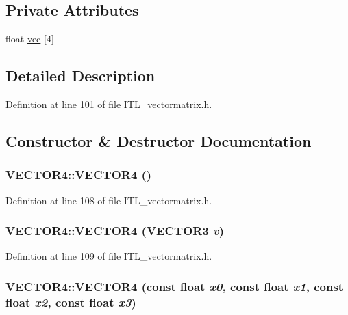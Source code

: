 \subsection*{Private Attributes}
\begin{DoxyCompactItemize}
\item 
float \hyperlink{classVECTOR4_a7dca1ecb9f6b6572df7b15abc1b882cb}{vec} \mbox{[}4\mbox{]}
\end{DoxyCompactItemize}


\subsection{Detailed Description}


Definition at line 101 of file ITL\_\-vectormatrix.h.



\subsection{Constructor \& Destructor Documentation}
\hypertarget{classVECTOR4_a0fa3ba169814c205b0c415b816efa415}{
\subsubsection[{VECTOR4}]{\setlength{\rightskip}{0pt plus 5cm}VECTOR4::VECTOR4 ()}}
\label{classVECTOR4_a0fa3ba169814c205b0c415b816efa415}


Definition at line 108 of file ITL\_\-vectormatrix.h.

\hypertarget{classVECTOR4_a03f888cfe21db9b688015038a148c2f7}{
\subsubsection[{VECTOR4}]{\setlength{\rightskip}{0pt plus 5cm}VECTOR4::VECTOR4 ({\bf VECTOR3} {\em v})}}
\label{classVECTOR4_a03f888cfe21db9b688015038a148c2f7}


Definition at line 109 of file ITL\_\-vectormatrix.h.

\hypertarget{classVECTOR4_a34f681d3c7082bd127ae8d4445bfc082}{
\subsubsection[{VECTOR4}]{\setlength{\rightskip}{0pt plus 5cm}VECTOR4::VECTOR4 (const float {\em x0}, \/  const float {\em x1}, \/  const float {\em x2}, \/  const float {\em x3})}}
\label{classVECTOR4_a34f681d3c7082bd127ae8d4445bfc082}


